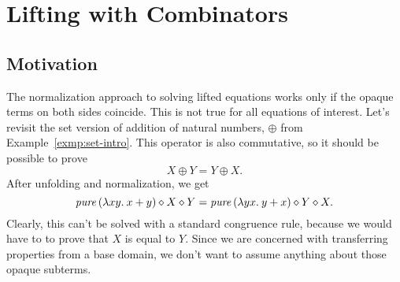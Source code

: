 \section{Lifting with Combinators}\label{sec:combinators}

\subsection{Motivation}\label{subsec:combinator-motivation}

The normalization approach to solving lifted equations works only if the
opaque terms on both sides coincide.
This is not true for all equations of interest.
Let's revisit the set version of addition of natural numbers, $\oplus$ from
Example~\ref{exmp:set-intro}.
This operator is also commutative, so it should be possible to prove
\[ X \oplus Y = Y \oplus X. \]
After unfolding and normalization, we get
\begin{equation}\label{eq:comb-intro1}
	\operatorname{\mathit{pure}}{(\lambda xy.\>x + y)} \diamond X \diamond Y = \operatorname{\mathit{pure}}{(\lambda yx.\>y + x)} \diamond Y \diamond X.
\end{equation}
Clearly, this can't be solved with a standard congruence rule, because we would
have to to prove that $X$ is equal to $Y$.
Since we are concerned with transferring properties from a base domain,
we don't want to assume anything about those opaque subterms.

